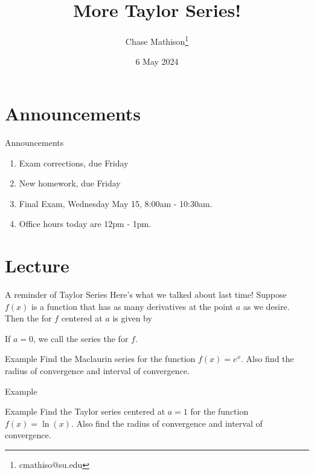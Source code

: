 \documentclass[presentation]{beamer}
\institute[SU]{Shenandoah University}
\author{Chase Mathison\thanks{cmathiso@su.edu}}
\date{6 May 2024}
\title{More Taylor Series!}
\begin{document}
\maketitle

\section{Announcements}
\label{sec:orgdad5ef1}
\begin{frame}[label={sec:org0929c71}]{Announcements}
\begin{enumerate}
\item Exam corrections, due Friday
\item New homework, due Friday
\item Final Exam, Wednesday May 15, 8:00am - 10:30am.
\item Office hours today are 12pm - 1pm.
\end{enumerate}
\end{frame}

\section{Lecture}
\label{sec:org680b3ad}
\begin{frame}[label={sec:orgd58c53e}]{A reminder of Taylor Series}
Here's what we talked about last time!  Suppose \(f(x)\) is a function that
has as many derivatives at the point \(a\) as we desire.  Then the \uline{\hspace*{1in}} for
\(f\) centered at \(a\) is given by

\vspace{1in}

If \(a = 0\), we call the series the \uline{\hspace*{1in}} for \(f\).
\end{frame}

\begin{frame}[label={sec:org391bfb0}]{Example}
Find the Maclaurin series for the function \(f(x) = e^x.\)  Also find the radius of convergence and interval of convergence.
\vspace{10in}
\end{frame}

\begin{frame}[label={sec:org3213743}]{Example}
\end{frame}

\begin{frame}[label={sec:org63f7afd}]{Example}
Find the Taylor series centered at \(a=1\) for the function \(f(x) =
\ln \left( x \right)\). Also find the radius of convergence and interval of convergence.
\vspace{10in}
\end{frame}
\end{document}
